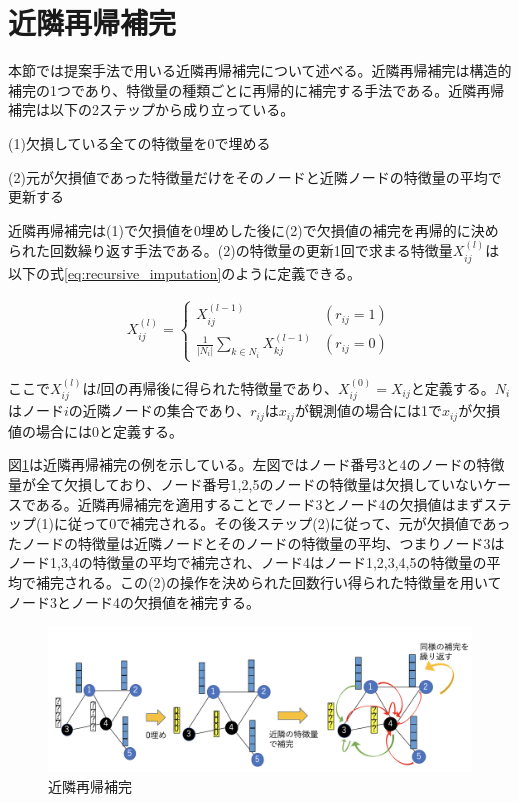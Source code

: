 \section{近隣再帰補完}
本節では提案手法で用いる近隣再帰補完について述べる。近隣再帰補完は構造的補完の1つであり、特徴量の種類ごとに再帰的に補完する手法である。近隣再帰補完は以下の2ステップから成り立っている。
\begin{description}
\item (1)欠損している全ての特徴量を0で埋める
\item (2)元が欠損値であった特徴量だけをそのノードと近隣ノードの特徴量の平均で更新する
\end{description}
近隣再帰補完は(1)で欠損値を0埋めした後に(2)で欠損値の補完を再帰的に決められた回数繰り返す手法である。(2)の特徴量の更新1回で求まる特徴量$X^{(l)}_{ij}$は以下の式\eqref{eq:recursive_imputation}のように定義できる。

\begin{align} \label{eq:recursive_imputation}
    X^{(l)}_{ij} =
    \begin{cases}
      X^{(l-1)}_{ij} & (r_{ij} = 1) \\
      \frac{1}{|N_{i}|}\sum_{k\in{N_{i}}}X^{(l-1)}_{kj} & (r_{ij} = 0)
    \end{cases}
\end{align}

ここで$X^{(l)}_{ij}$は$l$回の再帰後に得られた特徴量であり、$X^{(0)}_{ij} = X_{ij}$と定義する。$N_{i}$はノード$i$の近隣ノードの集合であり、$r_{ij}$は$x_{ij}$が観測値の場合には1で$x_{ij}$が欠損値の場合には0と定義する。

図\ref{fig:recursive_imputation}は近隣再帰補完の例を示している。左図ではノード番号3と4のノードの特徴量が全て欠損しており、ノード番号1,2,5のノードの特徴量は欠損していないケースである。近隣再帰補完を適用することでノード3とノード4の欠損値はまずステップ(1)に従って0で補完される。その後ステップ(2)に従って、元が欠損値であったノードの特徴量は近隣ノードとそのノードの特徴量の平均、つまりノード3はノード1,3,4の特徴量の平均で補完され、ノード4はノード1,2,3,4,5の特徴量の平均で補完される。この(2)の操作を決められた回数行い得られた特徴量を用いてノード3とノード4の欠損値を補完する。

\begin{figure}[h]
  \centering
  \includegraphics[width=1\hsize]{figures/recursive_imputation.png}
  \caption{近隣再帰補完}
  \label{fig:recursive_imputation}
\end{figure}

